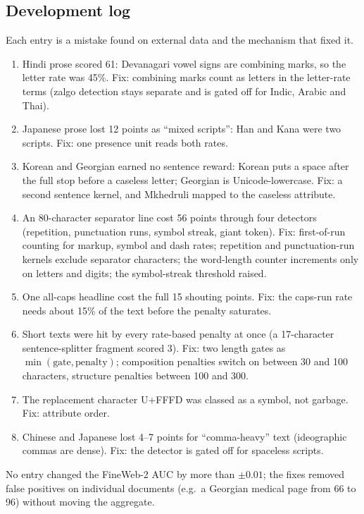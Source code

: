 \subsection{Development log}
\label{sec:tq-devlog}
Each entry is a mistake found on external data and the mechanism that fixed it.
\begin{enumerate}
\item Hindi prose scored 61: Devanagari vowel signs are combining marks, so
  the letter rate was 45\%. Fix: combining marks count as letters in the
  letter-rate terms (zalgo detection stays separate and is gated off for
  Indic, Arabic and Thai).
\item Japanese prose lost 12 points as ``mixed scripts'': Han and Kana were two
  scripts. Fix: one presence unit reads both rates.
\item Korean and Georgian earned no sentence reward: Korean puts a space after
  the full stop before a caseless letter; Georgian is Unicode-lowercase. Fix: a
  second sentence kernel, and Mkhedruli mapped to the caseless attribute.
\item An 80-character separator line cost 56 points through four detectors
  (repetition, punctuation runs, symbol streak, giant token). Fix:
  first-of-run counting for markup, symbol and dash rates; repetition and
  punctuation-run kernels exclude separator characters; the word-length counter
  increments only on letters and digits; the symbol-streak threshold raised.
\item One all-caps headline cost the full 15 shouting points. Fix: the caps-run
  rate needs about 15\% of the text before the penalty saturates.
\item Short texts were hit by every rate-based penalty at once (a 17-character
  sentence-splitter fragment scored 3). Fix: two length gates as
  $\min(\text{gate},\text{penalty})$; composition penalties switch on between 30
  and 100 characters, structure penalties between 100 and 300.
\item The replacement character U+FFFD was classed as a symbol, not garbage.
  Fix: attribute order.
\item Chinese and Japanese lost 4--7 points for ``comma-heavy'' text (ideographic
  commas are dense). Fix: the detector is gated off for spaceless scripts.
\end{enumerate}
No entry changed the FineWeb-2 AUC by more than $\pm0.01$; the fixes removed
false positives on individual documents (e.g.\ a Georgian medical page from 66 to
96) without moving the aggregate.

